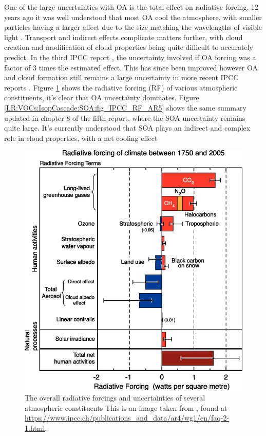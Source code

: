     One of the large uncertainties with OA is the total effect on radiative forcing, 12 years ago it was well understood that most OA cool the atmosphere, with smaller particles having a larger affect due to the size matching the wavelengths of visible light \citep{Kanakidou2005}. 
    Transport and indirect effects complicate matters further, with cloud creation and modification of cloud properties being quite difficult to accurately predict.
    In the third IPCC report \citep{IPCC2001}, the uncertainty involved if OA forcing was a factor of 3 times the estimated effect. 
    This has since been improved however OA and cloud formation still remains a large uncertainty in more recent IPCC reports \citep{IPCC_Chapter2}.
    Figure \ref{LR:VOCs:IsopCascade:SOA:fig_IPCC_RF_AR4} shows the radiative forcing (RF) of various atmospheric constituents, it's clear that OA uncertainty dominates.
    Figure \ref{LR:VOCs:IsopCascade:SOA:fig_IPCC_RF_AR5} shows the same summary updated in chapter 8 of the fifth report, where the SOA uncertainty remains quite large.
    It's currently understood that SOA plays an indirect and complex role in cloud properties, with a net cooling effect \citep[Chapter 7,8]{IPCC_AR5_WG1}
    
    \begin{figure}
      \includegraphics[width=\textwidth]{Figures/IPCC_WG1AR4_RFSummary.png}
      \caption{%
        The overall radiative forcings and uncertainties of several atmospheric constituents
        This is an image taken from \cite{IPCC_Chapter2}, found at \url{https://www.ipcc.ch/publications_and_data/ar4/wg1/en/faq-2-1.html}.}
      \label{LR:VOCs:IsopCascade:SOA:fig_IPCC_RF_AR4}
    \end{figure}
    
